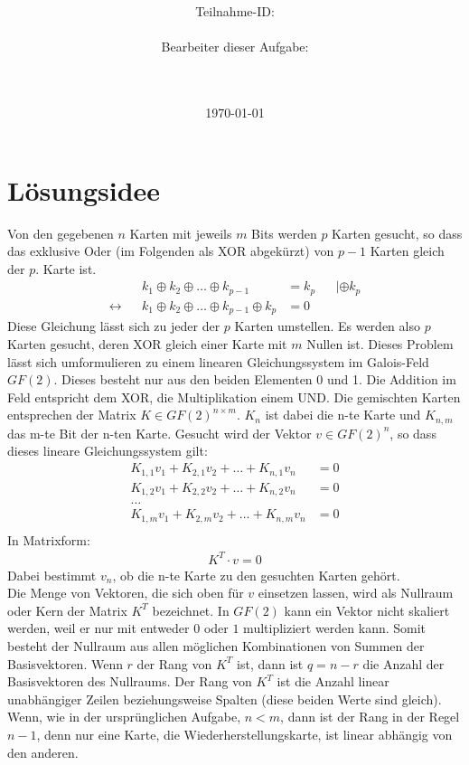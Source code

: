 \documentclass[a4paper,10pt,ngerman]{scrartcl}
\title{\textbf{\Huge\Aufgabe}}
\author{\LARGE Teilnahme-ID: \LARGE \TeamId \\\\
	    \LARGE Bearbeiter dieser Aufgabe: \\ 
	    \LARGE \Namen\\\\}
\date{\LARGE\today}
\newcommand*\xor{\oplus}
\begin{document}
\maketitle
\tableofcontents

\vspace{0.5cm}



\section{Lösungsidee}
Von den gegebenen $n$ Karten mit jeweils $m$ Bits werden $p$ Karten gesucht, so dass das exklusive Oder (im Folgenden als XOR abgekürzt) von $p-1$ Karten gleich der $p.$ Karte ist.
\begin{align*}
&& k_1 \xor k_2 \xor \ldots \xor k_{p-1} &= k_p && |\xor k_p \\
\leftrightarrow && k_1 \xor k_2 \xor \ldots \xor k_{p-1} \xor k_p &= 0 &&
\end{align*}
Diese Gleichung lässt sich zu jeder der $p$ Karten umstellen. Es werden also $p$ Karten gesucht, deren XOR gleich einer Karte mit $m$ Nullen ist. Dieses Problem lässt sich umformulieren zu einem linearen Gleichungssystem im Galois-Feld $GF(2)$. Dieses besteht nur aus den beiden Elementen 0 und 1. Die Addition im Feld entspricht dem XOR, die Multiplikation einem UND. Die gemischten Karten entsprechen der Matrix $K \in GF(2)^{n \times m}$. $K_n$ ist dabei die n-te Karte und $K_{n,m}$ das m-te Bit der n-ten Karte. Gesucht wird der Vektor $v \in GF(2)^n$, so dass dieses lineare Gleichungssystem gilt:
\begin{align*}
K_{1, 1} v_1 + K_{2, 1} v_2 + \ldots + K_{n, 1} v_n &= 0 \\
K_{1, 2} v_1 + K_{2, 2} v_2 + \ldots + K_{n, 2} v_n &= 0 \\
\ldots \\
K_{1, m} v_1 + K_{2, m} v_2 + \ldots + K_{n, m} v_n &= 0 \\ 
\end{align*}
In Matrixform:
\begin{align*}
K^T \cdot v = 0
\end{align*}
Dabei bestimmt $v_n$, ob die n-te Karte zu den gesuchten Karten gehört. \\
Die Menge von Vektoren, die sich oben für $v$ einsetzen lassen, wird als Nullraum oder Kern der Matrix $K^T$ bezeichnet. In $GF(2)$ kann ein Vektor nicht skaliert werden, weil er nur mit entweder $0$ oder $1$ multipliziert werden kann. Somit besteht der Nullraum aus allen möglichen Kombinationen von Summen der Basisvektoren. Wenn $r$ der Rang von $K^T$ ist, dann ist $q=n-r$ die Anzahl der Basisvektoren des Nullraums. Der Rang von $K^T$ ist die Anzahl linear unabhängiger Zeilen beziehungsweise Spalten (diese beiden Werte sind gleich). Wenn, wie in der ursprünglichen Aufgabe, $n<m$, dann ist der Rang in der Regel $n-1$, denn nur eine Karte, die Wiederherstellungskarte, ist linear abhängig von den anderen. \\
\end{document}
